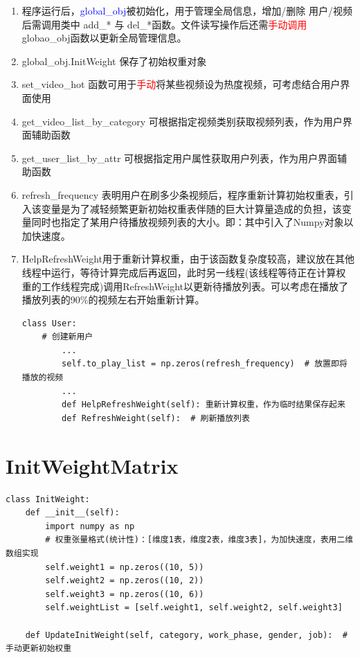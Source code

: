 \documentclass{article}
\begin{document}
\begin{enumerate}
    \item 程序运行后，\textcolor{blue}{global\_obj}被初始化，用于管理全局信息，增加/删除 用户/视频 后需调用类中 add\_* 与 del\_*函数。文件读写操作后还需\textcolor{red}{手动调用}globao\_obj函数以更新全局管理信息。
    \item global\_obj.InitWeight 保存了初始权重对象
    \item set\_video\_hot 函数可用于\textcolor{red}{手动}将某些视频设为热度视频，可考虑结合用户界面使用
    \item get\_video\_list\_by\_category 可根据指定视频类别获取视频列表，作为用户界面辅助函数
    \item get\_user\_list\_by\_attr 可根据指定用户属性获取用户列表，作为用户界面辅助函数
    \item refresh\_frequency 表明用户在刷多少条视频后，程序重新计算初始权重表，引入该变量是为了减轻频繁更新初始权重表伴随的巨大计算量造成的负担，该变量同时也指定了某用户待播放视频列表的大小。即：其中引入了Numpy对象以加快速度。
    \item HelpRefreshWeight用于重新计算权重，由于该函数复杂度较高，建议放在其他线程中运行，等待计算完成后再返回，此时另一线程(该线程等待正在计算权重的工作线程完成)调用RefreshWeight以更新待播放列表。可以考虑在播放了播放列表的90\%的视频左右开始重新计算。
    \begin{lstlisting}
class User:
    # 创建新用户
        ...
        self.to_play_list = np.zeros(refresh_frequency)  # 放置即将播放的视频
        ...
        def HelpRefreshWeight(self): 重新计算权重，作为临时结果保存起来
        def RefreshWeight(self):  # 刷新播放列表
    \end{lstlisting}
\end{enumerate}

\section{InitWeightMatrix}
\begin{lstlisting}
class InitWeight:
    def __init__(self):
        import numpy as np
        # 权重张量格式(统计性)：[维度1表，维度2表，维度3表]，为加快速度，表用二维数组实现
        self.weight1 = np.zeros((10, 5))
        self.weight2 = np.zeros((10, 2))
        self.weight3 = np.zeros((10, 6))
        self.weightList = [self.weight1, self.weight2, self.weight3]

    def UpdateInitWeight(self, category, work_phase, gender, job):  # 手动更新初始权重
\end{lstlisting}
\end{document}
